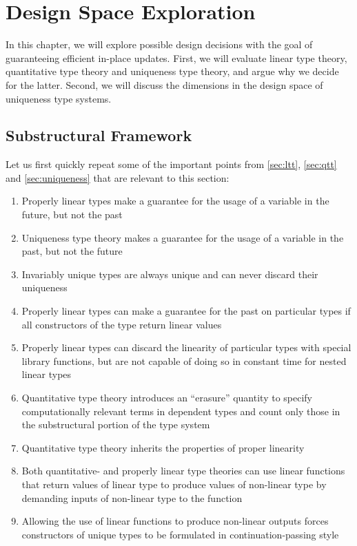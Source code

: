 \chapter{Design Space Exploration}\label{sec:designspace}

In this chapter, we will explore possible design decisions with the goal of guaranteeing efficient in-place updates. First, we will evaluate linear type theory, quantitative type theory and uniqueness type theory, and argue why we decide for the latter. Second, we will discuss the dimensions in the design space of uniqueness type systems.

\section{Substructural Framework}
Let us first quickly repeat some of the important points from \cref{sec:ltt}, \cref{sec:qtt} and \cref{sec:uniqueness} that are relevant to this section:
\begin{enumerate}
	\item Properly linear types make a guarantee for the usage of a variable in the future, but not the past
	\item Uniqueness type theory makes a guarantee for the usage of a variable in the past, but not the future
	\item Invariably unique types are always unique and can never discard their uniqueness
	\item Properly linear types can make a guarantee for the past on particular types if all constructors of the type return linear values
	\item Properly linear types can discard the linearity of particular types with special library functions, but are not capable of doing so in constant time for nested linear types
	\item Quantitative type theory introduces an ``erasure'' quantity to specify computationally relevant terms in dependent types and count only those in the substructural portion of the type system
	\item Quantitative type theory inherits the properties of proper linearity
	\item Both quantitative- and properly linear type theories can use linear functions that return values of linear type to produce values of non-linear type by demanding inputs of non-linear type to the function
	\item Allowing the use of linear functions to produce non-linear outputs forces constructors of unique types to be formulated in continuation-passing style
\end{enumerate}

